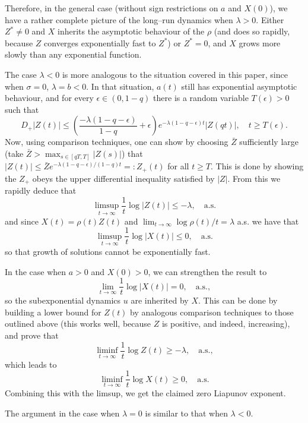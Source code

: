 \documentclass[a4paper,10pt,reqno]{amsart}
\numberwithin{equation}{section}
\theoremstyle{definition}
\theoremstyle{remark}
\DeclareMathOperator{\1}{\mathbbm 1}
\begin{document}
Therefore, in the general case (without sign  restrictions on $a$ and $X(0)$), we have a rather complete picture of the long--run dynamics when $\lambda>0$. Either $Z^\ast\neq 0$ and $X$ inherits the asymptotic behaviour of the $\rho$ (and does so rapidly, because $Z$ converges exponentially fast to $Z^\ast$) or $Z^\ast =0$, and $X$ grows more slowly than any exponential function.  

The case $\lambda<0$ is more analogous to the situation covered in this paper, since when $\sigma=0$, $\lambda=b<0$. In that situation, $a(t)$ still has exponential asymptotic behaviour, and for every $\epsilon\in (0,1-q)$ there is a random variable $T(\epsilon)>0$ such that 
\[
D_+|Z(t)|\leq \left(\frac{-\lambda(1-q-\epsilon)}{1-q}+\epsilon\right)e^{-\lambda(1-q-\epsilon)t}|Z(qt)|, \quad t\geq T(\epsilon).
\]
Now, using comparison techniques, one can show by choosing $\bar{Z}$ sufficiently large (take $\bar{Z}>\max_{s\in [qT,T]} |Z(s)|$) that $|Z(t)|\leq \bar{Z} e^{-\lambda(1-q-\epsilon)/(1-q)t}=:Z_+(t)$ for all $t\geq T$. This is done by showing the $Z_+$ obeys the upper differential inequality satisfied by $|Z|$. From this we rapidly deduce that 
\[
\limsup_{t\to\infty} \frac{1}{t}\log |Z(t)|\leq -\lambda, \quad \text{a.s.}
\]
and since $X(t)=\rho(t)Z(t)$ and 
$\lim_{t\to\infty} \log \rho(t)/t=\lambda$ a.s.
we have that 
\[
\limsup_{t\to\infty} \frac{1}{t}\log |X(t)|\leq 0, \quad \text{a.s.}
\]
so that growth of solutions cannot be exponentially fast. 

In the case when $a>0$ and $X(0)>0$, we can strengthen the result to 
\[
\lim_{t\to\infty} \frac{1}{t}\log|X(t)|=0, \quad\text{a.s.},
\]
so the subexponential dynamics $u$ are inherited by $X$. This can be done by building a lower bound for $Z(t)$ by analogous comparison techniques to those outlined above (this works well, because $Z$ is positive, and indeed, increasing), and prove that 
\[
\liminf_{t\to\infty} \frac{1}{t}\log Z(t)\geq -\lambda, \quad \text{a.s.},
\]
which leads to 
\[
\liminf_{t\to\infty} \frac{1}{t}\log X(t)\geq 0, \quad \text{a.s.}
\]
Combining this with the limsup, we get the claimed zero Liapunov exponent. 

The argument in the case when $\lambda=0$ is similar to that when $\lambda<0$. 


\end{document}
